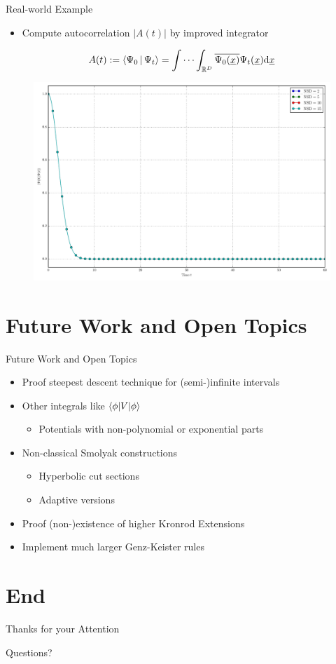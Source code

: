 \documentclass{beamer}
\begin{document}
\begin{frame}{Real-world Example }
  \begin{itemize}
    \item Compute autocorrelation $|A(t)|$ by improved integrator
  \end{itemize}
  \vspace{0.2cm}
  \begin{equation*}
    A(t) := \Braket{\Psi_0 | \Psi_t}
         = \idotsint_{\mathbb{R}^D} \overline{\Psi_0(\underline{x})} \Psi_t(\underline{x}) \mathrm{d}\underline{x}
  \end{equation*}
  \begin{figure}
    \centering
    \includegraphics[width=0.7\linewidth]{./fig/ac_mercurial_morse_nsd.pdf}
  \end{figure}
\end{frame}


\section{Future Work and Open Topics}


\begin{frame}{Future Work and Open Topics}
  \begin{itemize}
    \item Proof steepest descent technique for (semi-)infinite intervals
    \item Other integrals like $\braket{\phi|V|\phi}$
    \begin{itemize}
      \item Potentials with non-polynomial or exponential parts
    \end{itemize}
    \item Non-classical Smolyak constructions
    \begin{itemize}
      \item Hyperbolic cut sections
      \item Adaptive versions
    \end{itemize}
    \item Proof (non-)existence of higher Kronrod Extensions
    \item Implement much larger Genz-Keister rules
  \end{itemize}
\end{frame}


\section{End}


\begin{frame}{Thanks for your Attention}
  \begin{center}
    {\Huge{Questions?}}
  \end{center}
\end{frame}
\end{document}
